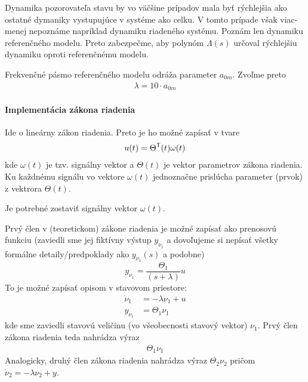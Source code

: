 \documentclass[a4paper, 10pt, ]{article}
\begin{document}
Dynamika pozorovateľa stavu by vo väčšine prípadov mala byť rýchlejšia ako ostatné dymaniky vystupujúce v systéme ako celku. V tomto prípade však viac-menej nepoznáme napríklad dynamiku riadeného systému. Poznám len dynamiku referenčného modelu. Preto zabezpečme, aby polynóm $\Lambda(s)$ určoval rýchlejšiu dynamiku oproti referenčnému modelu.

Frekvenčné pásmo referenčného modelu odráža parameter $a_{0m}$. Zvoľme preto
\begin{align}
    \lambda = 10 \cdot a_{0m}
\end{align}



\paragraph{Implementácia zákona riadenia}

Ide o lineárny zákon riadenia. Preto je ho možné zapísať v tvare
\begin{align}
    u(t) = \Theta^{\mathsf{T}}(t) \omega(t)
\end{align}
kde $\omega(t)$ je tzv. signálny vektor a $\Theta(t)$ je vektor parametrov zákona riadenia. Ku každnému signálu vo vektore $\omega(t)$ jednoznačne prislúcha parameter (prvok) z vektrora $\Theta(t)$.

\bigskip

\centerline{Je potrebné zostaviť signálny vektor $\omega(t)$.}

\bigskip

\noindent
Prvý člen v (teoretickom) zákone riadenia je možné zapísať ako prenosovú funkciu (zaviedli sme jej fiktívny výstup $y_{\nu_1}$ a dovoľujeme si nepísať všetky formálne detaily/predpoklady ako $y_{\nu_1}${\color{Gray}$(s)$} a podobne)
\begin{equation}
	y_{\nu_1} =   \frac{\Theta_1}{(s + \lambda)} u
\end{equation}
To je možné zapísať opisom v stavovom priestore:
\begin{subequations}
    \begin{align}
         \dot \nu_1 &= -\lambda \nu_1 + u \\
         y_{\nu_1} &= \Theta_1 \nu_1
    \end{align}
\end{subequations}
kde sme zaviedli stavovú veličinu (vo všeobecnosti stavový vektor) $\nu_1$. Prvý člen zákona riadenia teda nahrádza výraz
\begin{align}
     \Theta_1 \nu_1
\end{align}
Analogicky, druhý člen zákona riadenia nahrádza výraz $\Theta_2 \nu_2$ pričom $\dot \nu_2 = -\lambda \nu_2 + y$.
\end{document}

